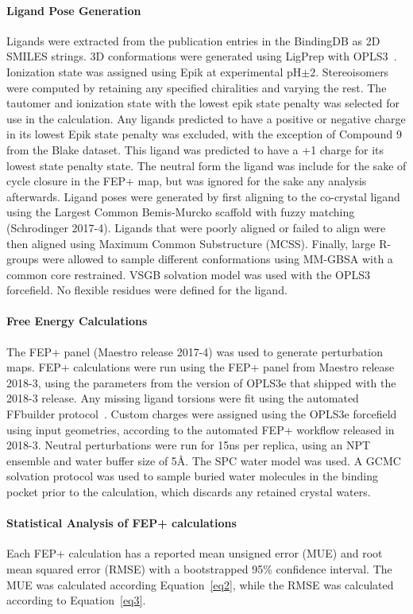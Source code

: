 \documentclass[9pt,lineno]{elife-modified} %
\begin{document}
\paragraph{Ligand Pose Generation}
Ligands were extracted from the publication entries in the BindingDB as 2D SMILES strings. 3D conformations were generated using LigPrep with OPLS3~\citep{Harder2016-zn}. Ionization state was assigned using Epik at experimental pH$\pm2$. Stereoisomers were computed by retaining any specified chiralities and varying the rest. The tautomer and ionization state with the lowest epik state penalty was selected for use in the calculation. Any ligands predicted to have a positive or negative charge in its lowest Epik state penalty was excluded, with the exception of Compound 9 from the Blake dataset. This ligand was predicted to have a +1 charge for its lowest state penalty state. The neutral form the ligand was include for the sake of cycle closure in the FEP+ map, but was ignored for the sake any analysis afterwards. Ligand poses were generated by first aligning to the co-crystal ligand using the Largest Common Bemis-Murcko scaffold with fuzzy matching (Schrodinger 2017-4). Ligands that were poorly aligned or failed to align were then aligned using Maximum Common Substructure (MCSS). Finally, large R-groups were allowed to sample different conformations using MM-GBSA with a common core restrained. VSGB solvation model was used with the OPLS3 forcefield. No flexible residues were defined for the ligand. 

\paragraph{Free Energy Calculations}
The FEP+ panel (Maestro release 2017-4) was used to generate perturbation maps. FEP+ calculations were run using the FEP+ panel from Maestro release 2018-3, using the parameters from the version of OPLS3e that shipped with the 2018-3 release. Any missing ligand torsions were fit using the automated FFbuilder protocol~\citep{Abel:Acc.Chem.Res.:2017}. Custom charges were assigned using the OPLS3e forcefield using input geometries, according to the automated FEP+ workflow released in 2018-3. Neutral perturbations were run for 15ns per replica, using an NPT ensemble and water buffer size of 5\AA. The SPC water model was used. A GCMC solvation protocol was used to sample buried water molecules in the binding pocket prior to the calculation, which discards any retained crystal waters. 

\paragraph{Statistical Analysis of FEP+ calculations}
Each FEP+ calculation has a reported mean unsigned error (MUE) and root mean squared error (RMSE) with a bootstrapped 95\% confidence interval. The MUE was calculated according Equation~\ref{eq2}, while the RMSE was calculated according to Equation~\ref{eq3}. 
\end{document}

